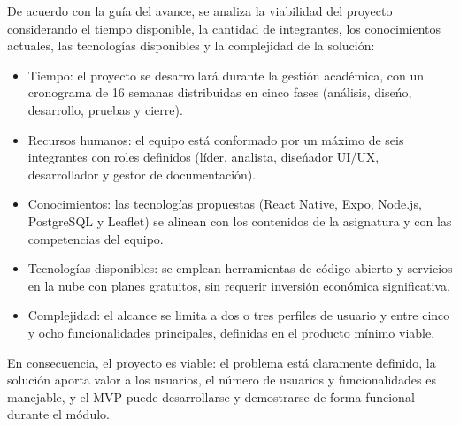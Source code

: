 De acuerdo con la gu\'ia del avance, se analiza la viabilidad del proyecto
considerando el tiempo disponible, la cantidad de integrantes, los
conocimientos actuales, las tecnolog\'ias disponibles y la complejidad de la
soluci\'on:

\begin{itemize}
  \item Tiempo: el proyecto se desarrollar\'a durante la gesti\'on
    acad\'emica, con un cronograma de 16 semanas distribuidas en cinco fases
    (an\'alisis, dise\'no, desarrollo, pruebas y cierre).
  \item Recursos humanos: el equipo est\'a conformado por un m\'aximo de
    seis integrantes con roles definidos (l\'ider, analista, dise\'nador UI/UX,
    desarrollador y gestor de documentaci\'on).
  \item Conocimientos: las tecnolog\'ias propuestas (React Native,
    Expo, Node.js, PostgreSQL y Leaflet) se alinean con los contenidos de la
    asignatura y con las competencias del equipo.
  \item Tecnolog\'ias disponibles: se emplean herramientas de c\'odigo
    abierto y servicios en la nube con planes gratuitos, sin requerir
    inversi\'on econ\'omica significativa.
  \item Complejidad: el alcance se limita a dos o tres perfiles de
    usuario y entre cinco y ocho funcionalidades principales, definidas en el
    producto m\'inimo viable.
\end{itemize}

En consecuencia, el proyecto es viable: el problema est\'a claramente
definido, la soluci\'on aporta valor a los usuarios, el n\'umero de usuarios y
funcionalidades es manejable, y el MVP puede desarrollarse y demostrarse de
forma funcional durante el m\'odulo.
